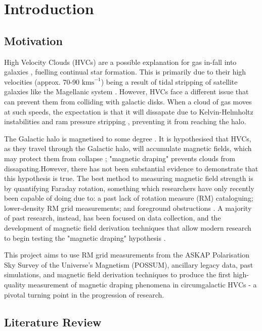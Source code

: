 \chapter{Introduction}
\label{cha:introduction}

\section{Motivation}
\label{sec:motivation}
High Velocity Clouds (HVCs) are a possible explanation for gas in-fall into galaxies \cite{ID7}, fuelling continual star formation. This is primarily due to their high velocities (approx. 70-90 $\mathrm{kms}^{-1}$) being a result of tidal stripping of satellite galaxies like the Magellanic system \cite{ID7, ID8}. However, HVCs face a different issue that can prevent them from colliding with galactic disks. When a cloud of gas moves at such speeds, the expectation is that it will dissapate due to Kelvin-Helmholtz instabilities and ram pressure stripping \cite{ID23, ID33, ID11}, preventing it from reaching the halo.

The Galactic halo is magnetised to some degree \cite{ID30}. It is hypothesised that HVCs, as they travel through the Galactic halo, will accumulate magnetic fields, which may protect them from collapse \cite{ID10, ID11, ID13, ID23, ID24, ID34}; "magnetic draping" prevents clouds from dissapating.However, there has not been substantial evidence to demonstrate that this hypothesis is true. The best method to measuring magnetic field strength is by quantifying Faraday rotation, something which researchers have only recently been  capable of doing due to: a past lack of rotation measure (RM) cataloguing; lower-density RM grid measurements; and foreground obstructions \cite{ID2, ID18, ID36}. A majority of past research, instead, has been focused on data collection, and the development of magnetic field derivation techniques that allow modern research to begin testing the "magnetic draping" hypothesis \cite{ID18, ID1, ID3, ID6, ID5, ID30, ID26}.

This project aims to use RM grid measurements from the ASKAP Polarisation Sky Survey of the Universe's Magnetism (POSSUM), ancillary legacy data, past simulations, and magnetic field derivation techniques to produce the first high-quality measurement of magnetic draping phenomena in circumgalactic HVCs - a pivotal turning point in the progression of research.

\section{Literature Review}
\label{sec:lit-review}

